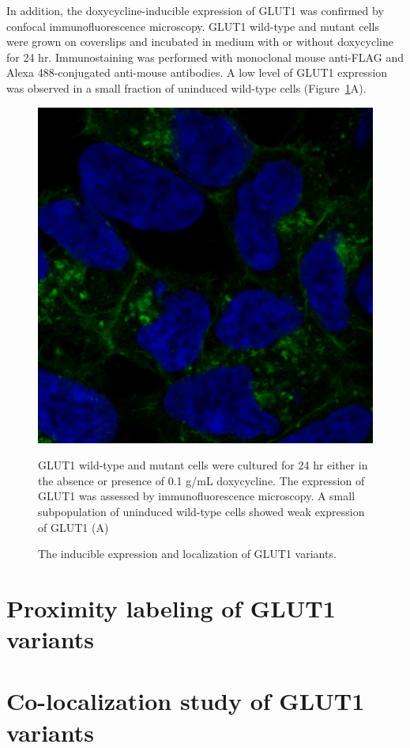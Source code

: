 In addition, the doxycycline-inducible expression of GLUT1 was confirmed by confocal immunofluorescence microscopy. GLUT1 wild-type and mutant cells were grown on coverslips and incubated in medium with or without doxycycline for 24 hr. Immunostaining was performed with monoclonal mouse anti-FLAG and Alexa 488-conjugated anti-mouse antibodies. A low level of GLUT1 expression was observed in a small fraction of uninduced wild-type cells (Figure~\ref{fig:IF}A).
\begin{figure}[h]
\centering
\includegraphics[scale=0.2]{Figures/induction_IF}
\caption{The inducible expression and localization of GLUT1 variants.}
\medskip
\small \raggedright
GLUT1 wild-type and mutant cells were cultured for 24 hr either in the absence or presence of 0.1 {}\textmu g/mL doxycycline. The expression of GLUT1 was assessed by immunofluorescence microscopy. A small subpopulation of uninduced wild-type cells showed weak expression of GLUT1 (A)
\label{fig:IF}
\end{figure}
\section{Proximity labeling of GLUT1 variants}

\section{Co-localization study of GLUT1 variants}

